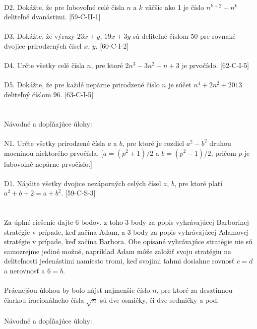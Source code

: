 \\
D2. Dokážte, že pre ľubovoľné celé čísla $n$ a $k$ väčšie ako 1 je číslo $n^{k+2} - n^k$ deliteľné
dvanástimi. [59-C-II-1]\\
\\
D3. Dokážte, že výrazy $23x + y$, $19x + 3y$ sú deliteľné číslom 50 pre rovnaké dvojice prirodzených čísel $x$, $y$. [60-C-I-2]\\
\\
D4. Určte všetky celé čísla $n$, pre ktoré $2n^3 - 3n^2+ n + 3$ je prvočíslo. [62-C-I-5]\\
\\
D5. Dokážte, že pre každé nepárne prirodzené číslo $n$ je súčet $n^4+ 2n^2+ 2 013$ deliteľný číslom 96. [63-C-I-5]\\
\\



\\
Návodné a dopľňajúce úlohy:\\
\\
N1. Určte všetky prirodzené čísla $a$ a $b$, pre ktoré je rozdiel $a^2 - b^2$ druhou mocninou
niektorého prvočísla. [$a = (p^2+ 1)/2$ a $b = (p^2 - 1)/2$, pričom $p$ je ľubovoľné nepárne prvočíslo.]\\
\\
D1. Nájdite všetky dvojice nezáporných celých čísel $a$, $b$, pre ktoré platí $a^2+b+2 = a+b^2$. [59-C-S-3]\\
\\


\\
Za úplné riešenie dajte 6 bodov, z toho 3 body za popis vyhrávajúcej Barborinej stratégie v prípade, keď začína Adam, a 3 body za popis vyhrávajúcej Adamovej stratégie v prípade, keď začína Barbora. Obe opísané vyhrávajúce stratégie nie sú samozrejme jediné možné, napríklad Adam môže založiť svoju stratégiu na deliteľnosti jedenástimi namiesto tromi, keď svojimi ťahmi dosiahne rovnosť $c = d$ a nerovnosť a $6= b$.\\
\\

Prácnejšou úlohou by bolo nájsť najmenšie číslo $n$, pre ktoré za desatinnou čiarkou iracionálneho čísla $\sqrt{n}$ sú dve osmičky, či dve sedmičky a pod.\\
\\
Návodné a dopľňajúce úlohy:\\

